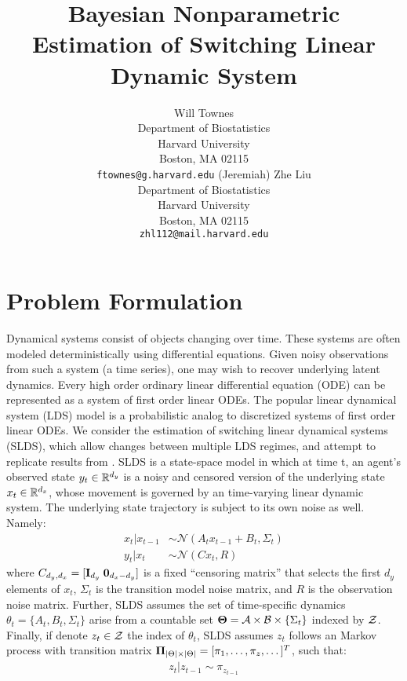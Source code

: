 \documentclass{article} %
\title{Bayesian Nonparametric Estimation of Switching Linear Dynamic System}
\author{
Will Townes \\
Department of Biostatistics\\
Harvard University\\
Boston, MA 02115 \\
\texttt{ftownes@g.harvard.edu}
\And
(Jeremiah) Zhe Liu \\
Department of Biostatistics\\
Harvard University\\
Boston, MA 02115 \\
\texttt{zhl112@mail.harvard.edu}
}
\begin{document}
\maketitle
\vspace*{-4em}
\tableofcontents
\thispagestyle{empty}
\newpage
\setcounter{page}{1}



\section{Problem Formulation}

Dynamical systems consist of objects changing over time. These systems are often modeled deterministically using differential equations. Given noisy observations from such a system (a time series), one may wish to recover underlying latent dynamics. Every high order ordinary linear differential equation (ODE) can be represented as a system of first order linear ODEs. The popular linear dynamical system (LDS) model is a probabilistic analog to discretized systems of first order linear ODEs. We consider the estimation of switching linear dynamical systems (SLDS), which allow changes between multiple LDS regimes, and attempt to replicate results from \cite{fox_bayesian_2009}. SLDS is a state-space model in which at time t, an agent's observed state $y_t \in {\mathbb R}^{d_y}$ is a noisy and censored version of the underlying state $x_t \in {\mathbb R}^{d_x}$, whose movement is governed by an time-varying linear dynamic system. The underlying state trajectory is subject to its own noise as well. Namely:
\begin{align} \label{eq:lds1}
x_t|x_{t-1}&\sim\mathcal{N}(A_t x_{t-1} + B_t,\Sigma_t) \\
y_t|x_t&\sim\mathcal{N}(C x_t,R)
\end{align}
where $C_{d_y, d_x} = [{\bf I}_{d_y} \; {\bf 0}_{d_x - d_y} ]$ is a fixed ``censoring matrix'' that selects the first $d_y$ elements of $x_t$, $\Sigma_t$ is the transition model noise matrix, and $R$ is the observation noise matrix. Further, SLDS assumes the set of time-specific dynamics $\theta_t = \{A_t, B_t, \Sigma_t\}$ arise from a countable set $\boldsymbol{\Theta} = {\cal A} \times {\cal B} \times \{\Sigma_t\}$ indexed by ${\cal Z}$. Finally, if denote $z_t \in {\cal Z}$ the index of $\theta_t$, SLDS assumes $z_t$ follows an Markov process with transition matrix $\boldsymbol{\Pi}_{|\Theta| \times |\Theta|} = [\pi_1, \dots, \pi_z, \dots]^T$, such that:
\begin{align*}
z_t | z_{t-1} \sim \pi_{z_{t-1}}
\end{align*}
\end{document}
